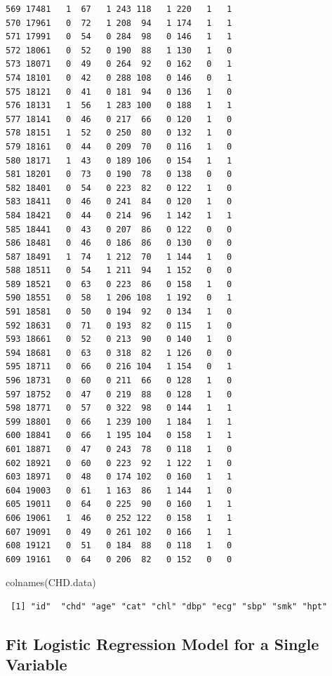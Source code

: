 \documentclass[
  letterpaper,
  DIV=11,
  numbers=noendperiod]{scrreprt}
\newenvironment{Shaded}{\begin{snugshade}}{\end{snugshade}}
\newcommand{\FunctionTok}[1]{\textcolor[rgb]{0.28,0.35,0.67}{#1}}
\newcommand{\NormalTok}[1]{\textcolor[rgb]{0.00,0.23,0.31}{#1}}
\begin{document}
\begin{verbatim}
569 17481   1  67   1 243 118   1 220   1   1
570 17961   0  72   1 208  94   1 174   1   1
571 17991   0  54   0 284  98   0 146   1   1
572 18061   0  52   0 190  88   1 130   1   0
573 18071   0  49   0 264  92   0 162   0   1
574 18101   0  42   0 288 108   0 146   0   1
575 18121   0  41   0 181  94   0 136   1   0
576 18131   1  56   1 283 100   0 188   1   1
577 18141   0  46   0 217  66   0 120   1   0
578 18151   1  52   0 250  80   0 132   1   0
579 18161   0  44   0 209  70   0 116   1   0
580 18171   1  43   0 189 106   0 154   1   1
581 18201   0  73   0 190  78   0 138   0   0
582 18401   0  54   0 223  82   0 122   1   0
583 18411   0  46   0 241  84   0 120   1   0
584 18421   0  44   0 214  96   1 142   1   1
585 18441   0  43   0 207  86   0 122   0   0
586 18481   0  46   0 186  86   0 130   0   0
587 18491   1  74   1 212  70   1 144   1   0
588 18511   0  54   1 211  94   1 152   0   0
589 18521   0  63   0 223  86   0 158   1   0
590 18551   0  58   1 206 108   1 192   0   1
591 18581   0  50   0 194  92   0 134   1   0
592 18631   0  71   0 193  82   0 115   1   0
593 18661   0  52   0 213  90   0 140   1   0
594 18681   0  63   0 318  82   1 126   0   0
595 18711   0  66   0 216 104   1 154   0   1
596 18731   0  60   0 211  66   0 128   1   0
597 18752   0  47   0 219  88   0 128   1   0
598 18771   0  57   0 322  98   0 144   1   1
599 18801   0  66   1 239 100   1 184   1   1
600 18841   0  66   1 195 104   0 158   1   1
601 18871   0  47   0 243  78   0 118   1   0
602 18921   0  60   0 223  92   1 122   1   0
603 18971   0  48   0 174 102   0 160   1   1
604 19003   0  61   1 163  86   1 144   1   0
605 19011   0  64   0 225  90   0 160   1   1
606 19061   1  46   0 252 122   0 158   1   1
607 19091   0  49   0 261 102   0 166   1   1
608 19121   0  51   0 184  88   0 118   1   0
609 19161   0  64   0 206  82   0 152   0   0
\end{verbatim}

\begin{Shaded}
\begin{Highlighting}[]
\FunctionTok{colnames}\NormalTok{(CHD.data)}
\end{Highlighting}
\end{Shaded}

\begin{verbatim}
 [1] "id"  "chd" "age" "cat" "chl" "dbp" "ecg" "sbp" "smk" "hpt"
\end{verbatim}

\subsection{Fit Logistic Regression Model for a Single
Variable}\label{fit-logistic-regression-model-for-a-single-variable}
\end{document}
